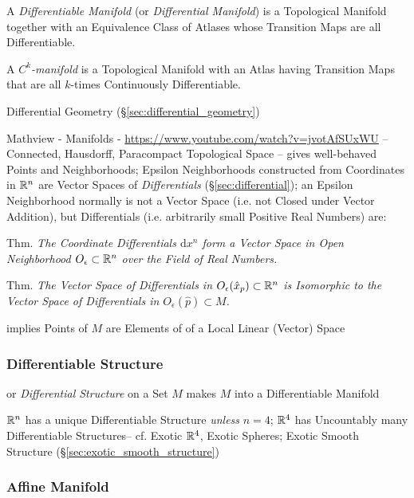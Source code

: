 A \emph{Differentiable Manifold} (or \emph{Differential Manifold}) is a
Topological Manifold together with an Equivalence Class of Atlases whose
Transition Maps are all Differentiable.

A \emph{$C^k$-manifold} is a Topological Manifold with an Atlas having
Transition Maps that are all $k$-times Continuously Differentiable.

\fist Differential Geometry (\S\ref{sec:differential_geometry})

\asterism

Mathview - Manifolds - \url{https://www.youtube.com/watch?v=jvotAfSUxWU}
--
Connected, Hausdorff, Paracompact Topological Space -- gives well-behaved Points
and Neighborhoods;
Epsilon Neighborhoods constructed from Coordinates in
$\mathbb{R}^n$ are Vector Spaces of \emph{Differentials} (\S\ref{sec:differential});
an Epsilon Neighborhood normally is not a Vector Space (i.e. not Closed under
Vector Addition), but Differentials (i.e. arbitrarily small Positive Real
Numbers) are:

Thm. \emph{The Coordinate Differentials $\mathrm{d}x^n$ form a Vector Space in
  Open Neighborhood $O_\epsilon \subset \mathbb{R}^n$ over the Field of Real
  Numbers.}

Thm. \emph{The Vector Space of Differentials in $O_\epsilon(\hat{x}_p) \subset
  \mathbb{R}^n$ is Isomorphic to the Vector Space of Differentials in
  $O_\epsilon(\hat{p}) \subset M$.}

implies Points of $M$ are Elements of of a Local Linear (Vector) Space



\subsubsection{Differentiable Structure}\label{sec:differentiable_structure}

or \emph{Differential Structure} on a Set $M$ makes $M$ into a Differentiable
Manifold

$\mathbb{R}^n$ has a unique Differentiable Structure \emph{unless} $n = 4$;
$\mathbb{R}^4$ has Uncountably many Differentiable Structures-- cf. Exotic
$\mathbb{R}^4$, Exotic Spheres; Exotic Smooth Structure
(\S\ref{sec:exotic_smooth_structure})



\subsubsection{Affine Manifold}\label{sec:affine_manifold}

